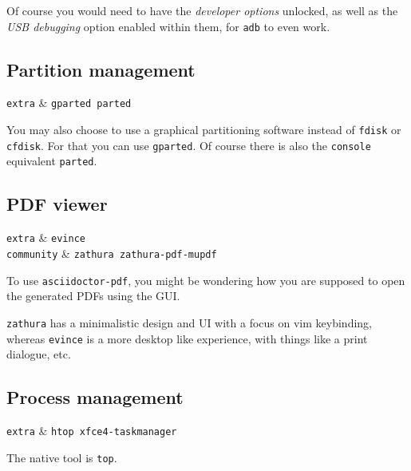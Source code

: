 \documentclass[10pt]{dustdoc}
\begin{document}
\begin{NOTE}
    Of course you would need to have the \emph{developer options} unlocked, as well as the \emph{USB debugging} option enabled within them, for \texttt{adb} to even work.
\end{NOTE}

\subsection{Partition management}
\label{sec:partition-management}

\begin{packagetable}
    \texttt{extra} & \texttt{gparted parted} \\
\end{packagetable}

You may also choose to use a graphical partitioning software instead of \texttt{fdisk} or \texttt{cfdisk}.
For that you can use \texttt{gparted}.
Of course there is also the \texttt{console} equivalent \texttt{parted}.

\subsection{PDF viewer}
\label{sec:gui-pdf-viewer}

\begin{packagetable}
    \texttt{extra} & \texttt{evince} \\
    \texttt{community} & \texttt{zathura zathura-pdf-mupdf} \\
\end{packagetable}

To use \texttt{asciidoctor-pdf}, you might be wondering how you are supposed to open the generated PDFs using the GUI.

\texttt{zathura} has a minimalistic design and UI with a focus on vim keybinding, whereas \texttt{evince} is a more desktop like experience, with things like a print dialogue, etc.

\subsection{Process management}
\label{sec:process-management}

\begin{packagetable}
    \texttt{extra} & \texttt{htop xfce4-taskmanager} \\
\end{packagetable}

The native tool is \texttt{top}.
\end{document}

